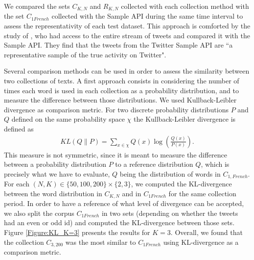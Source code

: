 We compared the sets $C_{K,N}$ and $R_{K,N}$ collected with each collection method with the set $C_{1 French}$ collected with the Sample API during the same time interval to assess the representativity of each test dataset. This approach is comforted by the study of \citet{morstatter_when_2014}, who had access to the entire stream of tweets and compared it with the Sample API. They find that the tweets from the Twitter Sample API are ``a representative sample of the true activity on Twitter".  


Several comparison methods can be used in order to assess the similarity between two collections of texts. A first approach consists in considering the number of times each word is used in each collection as a probability distribution, and to measure the difference between those distributions. We used Kullback-Leibler divergence \citep{kullback_information_1997} as comparison metric. For two discrete probability distributions $P$ and $Q$ defined on the same probability space $\chi$ the Kullback-Leibler divergence is defined as
\begin{align}
\label{eq:KL}
KL(Q\|P) =  \sum_{x\in \chi}Q(x)\log{(\frac{Q(x)}{P(x)})}.
\end{align}
This measure is not symmetric, since it is meant to measure the difference between a probability distribution $P$ to a reference distribution $Q$, which is precisely what we have to evaluate, $Q$ being the distribution of words in $C_{1, French}$. For each $(N,K) \in  \{50, 100, 200\} \times \{2,3\}$, we computed the KL-divergence between the word distribution in $C_{K,N}$ and in $C_{1 French}$ for the same collection period. In order to have a reference of what level of divergence can be accepted, we also split the corpus $C_{1 French}$ in two sets (depending on whether the tweets had an even or odd id) and computed the KL-divergence between those sets. Figure \ref{Figure:KL_K=3} presents the results for $K=3$. Overall, we found that the collection $C_{3,200}$ was the most similar to $C_{1 French}$ using KL-divergence as a comparison metric.


